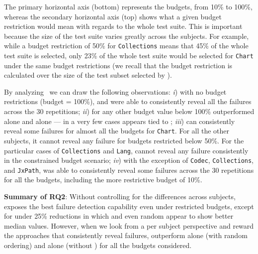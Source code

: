 The primary horizontal axis (bottom) represents the budgets, from 10\% to 100\%,
whereas the secondary horizontal axis (top) shows what a given budget restriction would mean with regards to the whole test suite.
This is important because the size of the test suite varies greatly across the subjects.
For example, while a budget restriction of 50\% for \texttt{Collections} means that 45\% of the whole test suite is selected, 
only 23\% of the whole test suite would be selected for \texttt{Chart} under the same budget restrictions
(we recall that the budget restriction is calculated over the size of the test subset selected by \ek).


By analyzing~ we can draw the following observations:
\textit{i}) with no budget restrictions (budget = 100\%), \ekr and \fz were able to consistently reveal all the failures across the 30 repetitions;
\textit{ii}) for any other budget value below 100\% \fz outperformed \ek alone and \fs alone --- in a very few cases \fs appears tied to \fz;
\textit{iii}) \ekr can consistently reveal some failures for almost all the budgets for \texttt{Chart}. 
For all the other subjects, it cannot reveal any failure for budgets restricted below 50\%.
For the particular cases of \texttt{Collections} and \texttt{Lang}, \ekr cannot reveal any failure consistently in the constrained budget scenario;
\textit{iv}) with the exception of \texttt{Codec}, \texttt{Collections}, and \texttt{JxPath}, 
\fz was able to consistently reveal some failures across the 30 repetitions for all the budgets, including the more restrictive budget of 10\%.

\begin{tcolorbox}%
\textbf{Summary of RQ2}: 
Without controlling for the differences across subjects, 
\fz exposes the best failure detection capability even under restricted budgets, 
except for under 25\% reductions in which \ekr and even random appear to show better median values.
However, when we look from a per subject perspective and reward the approaches that consistently reveal failures,
\fz outperform \ek alone (with random ordering) and \fs alone (without \tcs) for all the budgets considered.
\end{tcolorbox}



